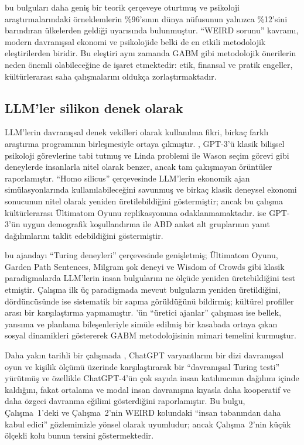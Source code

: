 \documentclass[11pt]{article}
\begin{document}
\citet{henrich2010} bu bulguları daha geniş bir teorik çerçeveye oturtmuş ve psikoloji araştırmalarındaki örneklemlerin \%96'sının dünya nüfusunun yalnızca \%12'sini barındıran ülkelerden geldiği uyarısında bulunmuştur. ``WEIRD sorunu'' kavramı, modern davranışsal ekonomi ve psikolojide belki de en etkili metodolojik eleştirilerden biridir. Bu eleştiri aynı zamanda GABM gibi metodolojik önerilerin neden önemli olabileceğine de işaret etmektedir: etik, finansal ve pratik engeller, kültürlerarası saha çalışmalarını oldukça zorlaştırmaktadır.

\subsection{LLM'ler silikon denek olarak}

LLM'lerin davranışsal denek vekilleri olarak kullanılma fikri, birkaç farklı araştırma programının birleşmesiyle ortaya çıkmıştır. \citet{binz2023}, GPT-3'ü klasik bilişsel psikoloji görevlerine tabi tutmuş ve Linda problemi ile Wason seçim görevi gibi deneylerde insanlarla nitel olarak benzer, ancak tam çakışmayan örüntüler raporlamıştır. \citet{horton2023} ``Homo silicus'' çerçevesinde LLM'lerin ekonomik ajan simülasyonlarında kullanılabileceğini savunmuş ve birkaç klasik deneysel ekonomi sonucunun nitel olarak yeniden üretilebildiğini göstermiştir; ancak bu çalışma kültürlerarası Ültimatom Oyunu replikasyonuna odaklanmamaktadır. \citet{argyle2023} ise GPT-3'ün uygun demografik koşullandırma ile ABD anket alt gruplarının yanıt dağılımlarını taklit edebildiğini göstermiştir.

\citet{aher2023} bu ajandayı ``Turing deneyleri'' çerçevesinde genişletmiş; Ültimatom Oyunu, Garden Path Sentences, Milgram şok deneyi ve Wisdom of Crowds gibi klasik paradigmalarda LLM'lerin insan bulgularını ne ölçüde yeniden üretebildiğini test etmiştir. Çalışma ilk üç paradigmada mevcut bulguların yeniden üretildiğini, dördüncüsünde ise sistematik bir sapma görüldüğünü bildirmiş; kültürel profiller arası bir karşılaştırma yapmamıştır. \citet{park2023}'ün ``üretici ajanlar'' çalışması ise bellek, yansıma ve planlama bileşenleriyle simüle edilmiş bir kasabada ortaya çıkan sosyal dinamikleri göstererek GABM metodolojisinin mimari temelini kurmuştur.

Daha yakın tarihli bir çalışmada \citet{mei2024}, ChatGPT varyantlarını bir dizi davranışsal oyun ve kişilik ölçümü üzerinde karşılaştırarak bir ``davranışsal Turing testi'' yürütmüş ve özellikle ChatGPT-4'ün çok sayıda insan katılımcının dağılımı içinde kaldığını, fakat ortalama ve modal insan davranışına kıyasla daha kooperatif ve daha özgeci davranma eğilimi gösterdiğini raporlamıştır. Bu bulgu, Çalışma~1'deki ve Çalışma~2'nin WEIRD kolundaki ``insan tabanından daha kabul edici'' gözlemimizle yönsel olarak uyumludur; ancak Çalışma~2'nin küçük ölçekli kolu bunun tersini göstermektedir.
\end{document}
